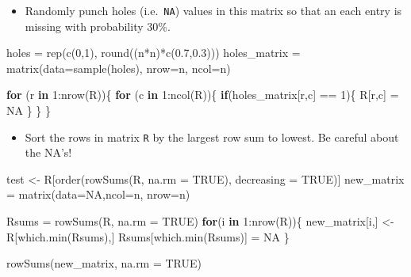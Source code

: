\documentclass[
]{article}
\newenvironment{Shaded}{\begin{snugshade}}{\end{snugshade}}
\newcommand{\AttributeTok}[1]{\textcolor[rgb]{0.77,0.63,0.00}{#1}}
\newcommand{\ConstantTok}[1]{\textcolor[rgb]{0.00,0.00,0.00}{#1}}
\newcommand{\ControlFlowTok}[1]{\textcolor[rgb]{0.13,0.29,0.53}{\textbf{#1}}}
\newcommand{\DecValTok}[1]{\textcolor[rgb]{0.00,0.00,0.81}{#1}}
\newcommand{\FloatTok}[1]{\textcolor[rgb]{0.00,0.00,0.81}{#1}}
\newcommand{\FunctionTok}[1]{\textcolor[rgb]{0.00,0.00,0.00}{#1}}
\newcommand{\NormalTok}[1]{#1}
\newcommand{\OtherTok}[1]{\textcolor[rgb]{0.56,0.35,0.01}{#1}}
\newcommand{\SpecialCharTok}[1]{\textcolor[rgb]{0.00,0.00,0.00}{#1}}
\providecommand{\tightlist}{%
  \setlength{\itemsep}{0pt}\setlength{\parskip}{0pt}}
\begin{document}
\begin{itemize}
\tightlist
\item
  Randomly punch holes (i.e.~\texttt{NA}) values in this matrix so that
  an each entry is missing with probability 30\%.
\end{itemize}

\begin{Shaded}
\begin{Highlighting}[]
\NormalTok{holes }\OtherTok{=} \FunctionTok{rep}\NormalTok{(}\FunctionTok{c}\NormalTok{(}\DecValTok{0}\NormalTok{,}\DecValTok{1}\NormalTok{), }\FunctionTok{round}\NormalTok{((n}\SpecialCharTok{*}\NormalTok{n)}\SpecialCharTok{*}\FunctionTok{c}\NormalTok{(}\FloatTok{0.7}\NormalTok{,}\FloatTok{0.3}\NormalTok{)))}
\NormalTok{holes\_matrix }\OtherTok{=} \FunctionTok{matrix}\NormalTok{(}\AttributeTok{data=}\FunctionTok{sample}\NormalTok{(holes), }\AttributeTok{nrow=}\NormalTok{n, }\AttributeTok{ncol=}\NormalTok{n)}

\ControlFlowTok{for}\NormalTok{ (r }\ControlFlowTok{in} \DecValTok{1}\SpecialCharTok{:}\FunctionTok{nrow}\NormalTok{(R))\{}
    \ControlFlowTok{for}\NormalTok{ (c }\ControlFlowTok{in} \DecValTok{1}\SpecialCharTok{:}\FunctionTok{ncol}\NormalTok{(R))\{}
        \ControlFlowTok{if}\NormalTok{(holes\_matrix[r,c] }\SpecialCharTok{==} \DecValTok{1}\NormalTok{)\{}
\NormalTok{          R[r,c] }\OtherTok{=} \ConstantTok{NA}
\NormalTok{        \}}
\NormalTok{    \}}
\NormalTok{\}}
\end{Highlighting}
\end{Shaded}

\begin{itemize}
\tightlist
\item
  Sort the rows in matrix \texttt{R} by the largest row sum to lowest.
  Be careful about the NA's!
\end{itemize}

\begin{Shaded}
\begin{Highlighting}[]
\NormalTok{test }\OtherTok{\textless{}{-}}\NormalTok{ R[}\FunctionTok{order}\NormalTok{(}\FunctionTok{rowSums}\NormalTok{(R, }\AttributeTok{na.rm =} \ConstantTok{TRUE}\NormalTok{), }\AttributeTok{decreasing =} \ConstantTok{TRUE}\NormalTok{)]}
\NormalTok{new\_matrix }\OtherTok{=} \FunctionTok{matrix}\NormalTok{(}\AttributeTok{data=}\ConstantTok{NA}\NormalTok{,}\AttributeTok{ncol=}\NormalTok{n, }\AttributeTok{nrow=}\NormalTok{n)}

\NormalTok{Rsums }\OtherTok{=} \FunctionTok{rowSums}\NormalTok{(R, }\AttributeTok{na.rm =} \ConstantTok{TRUE}\NormalTok{)}
\ControlFlowTok{for}\NormalTok{(i }\ControlFlowTok{in} \DecValTok{1}\SpecialCharTok{:}\FunctionTok{nrow}\NormalTok{(R))\{}
\NormalTok{  new\_matrix[i,] }\OtherTok{\textless{}{-}}\NormalTok{ R[}\FunctionTok{which.min}\NormalTok{(Rsums),]}
\NormalTok{  Rsums[}\FunctionTok{which.min}\NormalTok{(Rsums)] }\OtherTok{=} \ConstantTok{NA}
\NormalTok{\}}

\FunctionTok{rowSums}\NormalTok{(new\_matrix, }\AttributeTok{na.rm =} \ConstantTok{TRUE}\NormalTok{)}
\end{Highlighting}
\end{Shaded}
\end{document}
